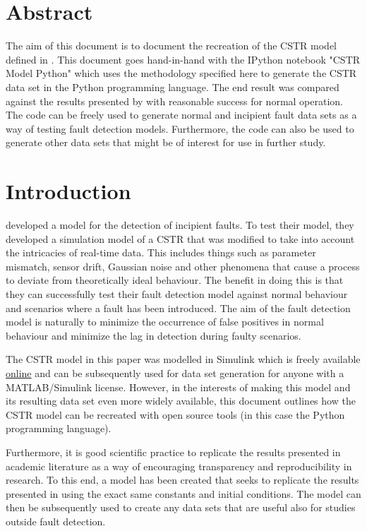 \documentclass{article}
\begin{document}
\section{Abstract}	
The aim of this document is to document the recreation of the CSTR model defined in \cite{pilario2018canonical}. This document goes hand-in-hand with the IPython notebook 
"CSTR Model Python" which uses the methodology specified here to generate the CSTR data set in the Python programming language. The end result was compared against the results presented by \cite{pilario2018canonical} with reasonable success for normal operation. The code can be freely used to generate normal and incipient fault data sets as a way of testing fault detection models. Furthermore, the code can also be used to generate other data sets that might be of interest for use in further study.


\section{Introduction}

\cite{pilario2018canonical} developed a model for the detection of incipient faults. To test their model, they developed a simulation model of a CSTR that was modified to take into account the intricacies of real-time data. This includes things such as parameter mismatch, sensor drift, Gaussian noise and other phenomena that cause a process to deviate from theoretically ideal behaviour. The benefit in doing this is that they can successfully test their fault detection model against normal behaviour and scenarios where a fault has been introduced. The aim of the fault detection model is naturally to minimize the occurrence of false positives in normal behaviour and minimize the lag in detection during faulty scenarios. 

The CSTR model in this paper was modelled in Simulink which is freely available \href{https://uk.mathworks.com/matlabcentral/fileexchange/66189-feedback-controlled-cstr-process-for-fault-simulation}{online} and can be subsequently used for data set generation for anyone with a MATLAB/Simulink license. However, in the interests of making this model and its resulting data set even more widely available, this document outlines how the CSTR model can be recreated with open source tools (in this case the Python programming language).

Furthermore, it is good scientific practice to replicate the results presented in academic literature as a way of encouraging transparency and reproducibility in research. To this end, a model has been created that seeks to replicate the results presented in \cite{pilario2018canonical} using the exact same constants and initial conditions. The model can then be subsequently used to create any data sets that are useful also for studies outside fault detection.
\end{document}
